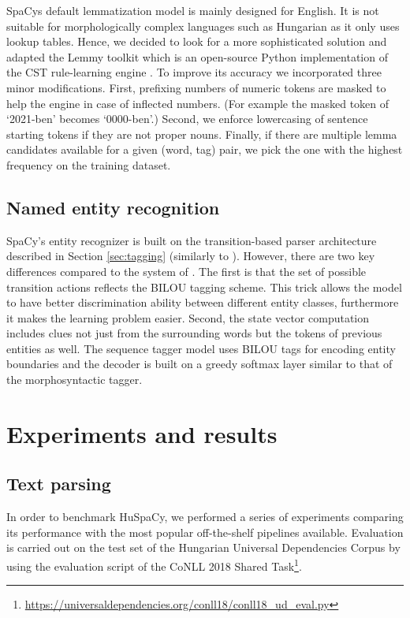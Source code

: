 \documentclass{llncs}
\newcommand{\huspacy}{HuSpaCy}
\newcommand{\lemmy}{Lemmy}
\begin{document}
SpaCy\textquotesingle s default lemmatization model is mainly designed for English. It is not suitable for morphologically complex languages such as Hungarian as it only uses lookup tables. Hence, we decided to look for a more sophisticated solution and adapted the \lemmy{} toolkit \citep{lemmy} which is an open-source Python implementation of the CST rule-learning engine \citep{cst-lemmatizer}. To improve its accuracy we incorporated three minor modifications. First, prefixing numbers of numeric tokens are masked to help the engine in case of inflected numbers. (For example the masked token of `2021-ben’ becomes `0000-ben’.) Second, we enforce lowercasing of sentence starting tokens if they are not proper nouns. Finally, if there are multiple lemma candidates available for a given (word, tag) pair, we pick the one with the highest frequency on the training dataset.

\subsection{Named entity recognition}

SpaCy’s entity recognizer is built on the transition-based parser architecture described in Section \ref{sec:tagging} (similarly to \citet{spacy-ner}). 
However, there are two key differences compared to the system of \citet{spacy-ner}. 
The first is that the set of possible transition actions reflects the BILOU tagging scheme. This trick allows the model to have better discrimination ability between different entity classes, furthermore it makes the learning problem easier. 
Second, the state vector computation includes clues not just from the surrounding words but the tokens of previous entities as well. 
The sequence tagger model uses BILOU tags for encoding entity boundaries and the decoder is built on a greedy softmax layer similar to that of the morphosyntactic tagger.

\section{Experiments and results}
\subsection{Text parsing}
\label{parser-eval}

In order to benchmark \huspacy{}, we performed a series of experiments comparing its performance with the most popular off-the-shelf pipelines available. Evaluation is carried out on the test set of the Hungarian Universal Dependencies Corpus \citep{UniDep} by using the evaluation script of the CoNLL 2018 Shared Task\footnote{\url{https://universaldependencies.org/conll18/conll18_ud_eval.py}}. 
\end{document}

